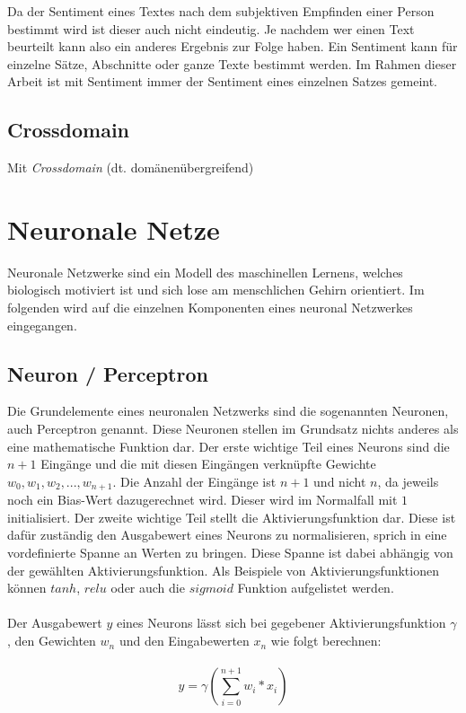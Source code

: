 Da der Sentiment eines Textes nach dem subjektiven Empfinden einer Person bestimmt wird ist dieser auch nicht eindeutig. Je nachdem wer einen Text beurteilt kann also ein anderes Ergebnis zur Folge haben. Ein Sentiment kann für einzelne Sätze, Abschnitte oder ganze Texte bestimmt werden. Im Rahmen dieser Arbeit ist mit Sentiment immer der Sentiment eines einzelnen Satzes gemeint.

\subsection{Crossdomain}
Mit \emph{Crossdomain} (dt. domänenübergreifend) 
\section{Neuronale Netze}
\label{basics:neural_network}
Neuronale Netzwerke sind ein Modell des maschinellen Lernens, welches biologisch motiviert ist und sich lose am menschlichen Gehirn orientiert. Im folgenden wird auf die einzelnen Komponenten eines neuronal Netzwerkes eingegangen.
\subsection{Neuron / Perceptron}
Die Grundelemente eines neuronalen Netzwerks sind die sogenannten Neuronen, auch Perceptron genannt. Diese Neuronen stellen im Grundsatz nichts anderes als eine mathematische Funktion dar. Der erste wichtige Teil eines Neurons sind die $n + 1$ Eingänge und die mit diesen Eingängen verknüpfte Gewichte ${w_0, w_1, w_2, ..., w_{n+1}}$. Die Anzahl der Eingänge ist $n+1$ und nicht $n$, da jeweils noch ein Bias-Wert dazugerechnet wird. Dieser wird im Normalfall mit $1$ initialisiert. Der zweite wichtige Teil stellt die Aktivierungsfunktion dar. Diese ist dafür zuständig den Ausgabewert eines Neurons zu normalisieren, sprich in eine vordefinierte Spanne an Werten zu bringen. Diese Spanne ist dabei abhängig von der gewählten Aktivierungsfunktion. Als Beispiele von Aktivierungsfunktionen können $tanh$, $relu$ oder auch die $sigmoid$ Funktion aufgelistet werden.\\\\
Der Ausgabewert $y$ eines Neurons lässt sich bei gegebener Aktivierungsfunktion $\gamma$, den Gewichten $w_n$ und den Eingabewerten $x_n$ wie folgt berechnen:\\\\

\begin{equation}
y = \gamma(\sum_{i=0}^{n+1} w_i*x_i)
\end{equation}


